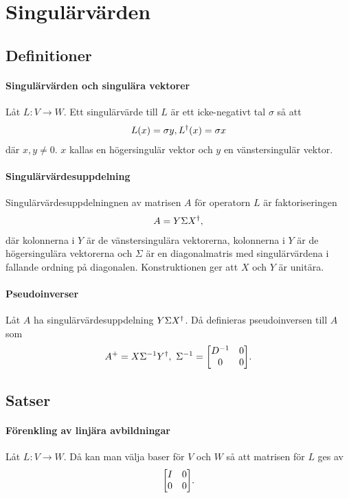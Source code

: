 \section{Singulärvärden}

\subsection{Definitioner}

\paragraph{Singulärvärden och singulära vektorer}
Låt $L: V\to W$. Ett singulärvärde till $L$ är ett icke-negativt tal $\sigma$ så att
\begin{align*}
	L(x) = \sigma y, L^{\dagger}(x) = \sigma x
\end{align*}
där $x, y\neq 0$. $x$ kallas en högersingulär vektor och $y$ en vänstersingulär vektor.

\paragraph{Singulärvärdesuppdelning}
Singulärvärdesuppdelningnen av matrisen $A$ för operatorn $L$ är faktoriseringen
\begin{align*}
	A = Y\Sigma X^{\dagger},
\end{align*}
där kolonnerna i $Y$ är de vänstersingulära vektorerna, kolonnerna i $Y$ är de högersingulära vektorerna och $\Sigma$ är en diagonalmatris med singulärvärdena i fallande ordning på diagonalen. Konstruktionen ger att $X$ och $Y$ är unitära.

\paragraph{Pseudoinverser}
Låt $A$ ha singulärvärdesuppdelning $Y\Sigma X^{\dagger}$. Då definieras pseudoinversen till $A$ som
\begin{align*}
	A^{+} = X\Sigma^{-1}\adj{Y}, \ \Sigma^{-1} =
	\mqty[
		D^{-1} & 0 \\
		0      & 0
	].
\end{align*}

\subsection{Satser}

\paragraph{Förenkling av linjära avbildningar}
Låt $L: V\to W$. Då kan man välja baser för $V$ och $W$ så att matrisen för $L$ ges av
\begin{align*}
	\mqty[
		I & 0 \\
		0 & 0
	].
\end{align*}

